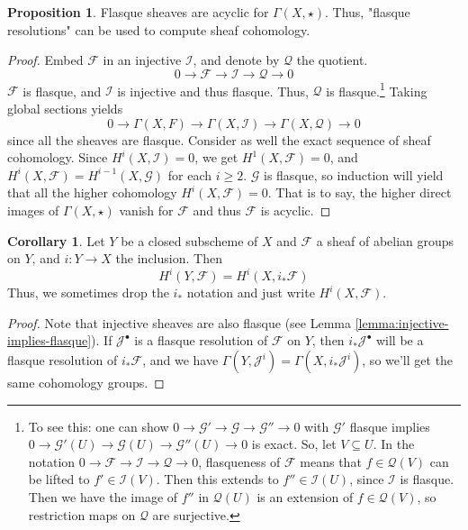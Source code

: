 \documentclass[10pt,reqno]{amsart}
\theoremstyle{definition}
\newtheorem{corollary}[theorem]{Corollary}
\newtheorem{proposition}[theorem]{Proposition}
\theoremstyle{remark}
\numberwithin{equation}{section}
\numberwithin{theorem}{section}
\newcommand{\FF}{{\mathscr F}}
\newcommand{\II}{{\mathscr I}}
\newcommand{\JJ}{{\mathscr J}}
\newcommand{\GG}{{\mathscr G}}
\begin{document}
\begin{proposition} Flasque sheaves are acyclic for $\Gamma(X,\star)$. Thus, "flasque resolutions" can be used to compute sheaf cohomology.
\end{proposition}
\begin{proof}
Embed $\FF$ in an injective $\II$, and denote by $\mathscr{Q}$ the quotient.
\[0 \to \FF \to \II \to \mathscr{Q} \to 0\]
$\FF$ is flasque, and $\II$ is injective and thus flasque. Thus, $\mathscr{Q}$ is flasque.\footnote{To see this: one can show $0 \to \GG ' \to \GG \to \GG '' \to 0$ with $\GG'$ flasque implies $0 \to \GG'(U) \to \GG(U) \to \GG''(U) \to 0$ is exact. So, let $V \subseteq U$. In the notation $0 \to \FF \to \II \to \mathscr{Q} \to 0$, flasqueness of $\FF$ means that $f \in \mathscr{Q}(V)$ can be lifted to $f' \in \II(V)$. Then this extends to $f'' \in \II(U)$, since $\II$ is flasque. Then we have the image of $f''$ in $\mathscr{Q}(U)$ is an extension of $f \in \mathscr{Q}(V)$, so restriction maps on $\mathscr{Q}$ are surjective.}
Taking global sections yields
\[ 0 \to \Gamma(X,F) \to \Gamma(X,\II) \to \Gamma(X,\mathscr{Q}) \to 0\]
since all the sheaves are flasque. Consider as well the exact sequence of sheaf cohomology. Since $H^i(X,\II) = 0$, we get $H^1(X,\FF) = 0$, and $H^i(X,\FF) = H^{i-1}(X,\GG)$ for each $i \ge 2$. $\GG$ is flasque, so induction will yield that all the higher cohomology $H^i(X,\FF) = 0$. That is to say, the higher direct images of $\Gamma(X,\star)$ vanish for $\FF$ and thus $\FF$ is acyclic.
\end{proof}

\begin{corollary} Let $Y$ be a closed subscheme of $X$ and $\FF$ a sheaf of abelian groups on $Y$, and $i: Y \to X$ the inclusion. Then
\[H^i(Y,\FF) = H^i(X,i_*\FF)\]
Thus, we sometimes drop the $i_*$ notation and just write $H^i(X,\FF)$.
\end{corollary}
\begin{proof}
Note that injective sheaves are also flasque (see Lemma \ref{lemma:injective-implies-flasque}). If $\JJ^{\bullet}$ is a flasque resolution of $\FF$ on $Y$, then $i_*\JJ^{\bullet}$ will be a flasque resolution of $i_*\FF$, and we have $\Gamma(Y,\JJ^i) = \Gamma(X,i_* \JJ^i)$, so we'll get the same cohomology groups.
\end{proof}


\end{document}
